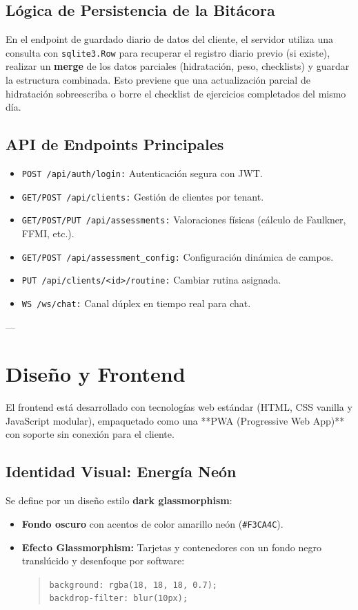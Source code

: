 \documentclass[11pt]{article}
\begin{document}
\subsection{Lógica de Persistencia de la Bitácora}
En el endpoint de guardado diario de datos del cliente, el servidor utiliza una consulta con \texttt{sqlite3.Row} para recuperar el registro diario previo (si existe), realizar un \textbf{merge} de los datos parciales (hidratación, peso, checklists) y guardar la estructura combinada. Esto previene que una actualización parcial de hidratación sobreescriba o borre el checklist de ejercicios completados del mismo día.

\subsection{API de Endpoints Principales}
\begin{itemize}
    \item \texttt{POST /api/auth/login:} Autenticación segura con JWT.
    \item \texttt{GET/POST /api/clients:} Gestión de clientes por tenant.
    \item \texttt{GET/POST/PUT /api/assessments:} Valoraciones físicas (cálculo de Faulkner, FFMI, etc.).
    \item \texttt{GET/POST /api/assessment\_config:} Configuración dinámica de campos.
    \item \texttt{PUT /api/clients/<id>/routine:} Cambiar rutina asignada.
    \item \texttt{WS /ws/chat:} Canal dúplex en tiempo real para chat.
\end{itemize}

---

\section{Diseño y Frontend}
El frontend está desarrollado con tecnologías web estándar (HTML, CSS vanilla y JavaScript modular), empaquetado como una **PWA (Progressive Web App)** con soporte sin conexión para el cliente.

\subsection{Identidad Visual: Energía Neón}
Se define por un diseño estilo \textbf{dark glassmorphism}:
\begin{itemize}
    \item \textbf{Fondo oscuro} con acentos de color amarillo neón (\texttt{\#F3CA4C}).
    \item \textbf{Efecto Glassmorphism:} Tarjetas y contenedores con un fondo negro translúcido y desenfoque por software:
    \begin{quote}\footnotesize
        \texttt{background: rgba(18, 18, 18, 0.7); \\ backdrop-filter: blur(10px);}
    \end{quote}
\end{itemize}
\end{document}
